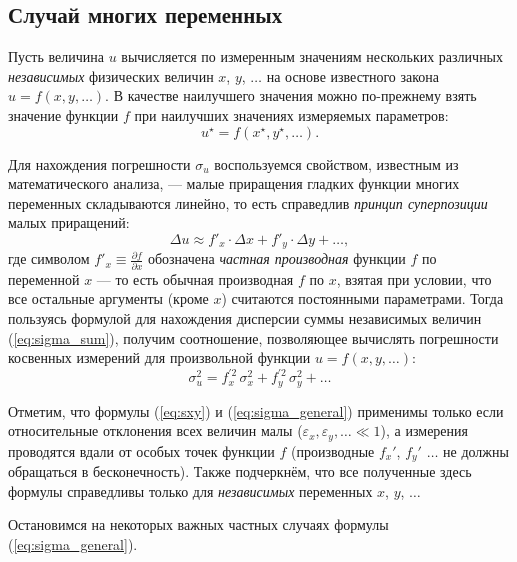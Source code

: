 

\subsection{Случай многих переменных}

Пусть величина $u$ вычисляется по измеренным значениям нескольких
различных \emph{независимых} физических величин $x$, $y$, $\ldots$
на основе известного закона $u=f\!\left(x,y,\ldots\right)$. В качестве
наилучшего значения можно по-прежнему взять значение функции $f$
при наилучших значениях измеряемых параметров:
\[
u^{\star}=f\!\left(x^{\star},y^{\star},\ldots\right).
\]

Для нахождения погрешности $\sigma_{u}$ воспользуемся свойством,
известным из математического анализа, --- малые приращения гладких
функции многих переменных складываются линейно, то есть справедлив
\emph{принцип суперпозиции} малых приращений:
\[
\Delta u\approx f'_{x}\cdot\Delta x+f'_{y}\cdot\Delta y+\ldots,
\]
где символом $f'_{x}\equiv\frac{\partial f}{\partial x}$ обозначена
\emph{частная производная} функции $f$ по переменной $x$ ---
то есть обычная производная $f$ по $x$, взятая при условии, что
все остальные аргументы (кроме $x$) считаются постоянными параметрами.
Тогда пользуясь формулой для нахождения дисперсии суммы независимых
величин (\ref{eq:sigma_sum}), получим соотношение, позволяющее вычислять
погрешности косвенных измерений для произвольной функции
$u=f\left(x,y,\ldots\right)$:
\begin{equation}
\boxed{\sigma_{u}^{2}=f_{x}^{\prime2}\,\sigma_{x}^{2}+f_{y}^{\prime2}\,\sigma_{y
}^{2}+\ldots}\label{eq:sigma_general}
\end{equation}

Отметим, что формулы (\ref{eq:sxy}) и (\ref{eq:sigma_general}) применимы
только если относительные отклонения всех величин малы
($\varepsilon_{x},\varepsilon_{y},\ldots\ll1$),
а измерения проводятся вдали от особых точек функции $f$ (производные
$f_{x}'$, $f_{y}'$ $\ldots$ не должны обращаться в бесконечность).
Также подчеркнём, что все полученные здесь формулы справедливы только
для \emph{независимых} переменных $x$, $y$, $\ldots$

Остановимся на некоторых важных частных случаях формулы
(\ref{eq:sigma_general}).

